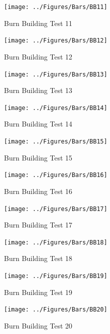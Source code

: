 \documentclass[12pt,oneside]{book}
\begin{document}
\clearpage

\begin{figure}[!ht]
	\texttt{[image: ../Figures/Bars/BB11]}
	\caption{Burn Building Test 11}
	\label{fig:Burn_Building_Test_11}
\end{figure}

\begin{figure}[!ht]
	\texttt{[image: ../Figures/Bars/BB12]}
	\caption{Burn Building Test 12}
	\label{fig:Burn_Building_Test_12}
\end{figure}

\begin{figure}[!ht]
	\texttt{[image: ../Figures/Bars/BB13]}
	\caption{Burn Building Test 13}
	\label{fig:Burn_Building_Test_13}
\end{figure}

\begin{figure}[!ht]
	\texttt{[image: ../Figures/Bars/BB14]}
	\caption{Burn Building Test 14}
	\label{fig:Burn_Building_Test_14}
\end{figure}

\clearpage

\begin{figure}[!ht]
	\texttt{[image: ../Figures/Bars/BB15]}
	\caption{Burn Building Test 15}
	\label{fig:Burn_Building_Test_15}
\end{figure}

\begin{figure}[!ht]
	\texttt{[image: ../Figures/Bars/BB16]}
	\caption{Burn Building Test 16}
	\label{fig:Burn_Building_Test_16}
\end{figure}

\begin{figure}[!ht]
	\texttt{[image: ../Figures/Bars/BB17]}
	\caption{Burn Building Test 17}
	\label{fig:Burn_Building_Test_17}
\end{figure}

\begin{figure}[!ht]
	\texttt{[image: ../Figures/Bars/BB18]}
	\caption{Burn Building Test 18}
	\label{fig:Burn_Building_Test_18}
\end{figure}

\clearpage

\begin{figure}[!ht]
	\texttt{[image: ../Figures/Bars/BB19]}
	\caption{Burn Building Test 19}
	\label{fig:Burn_Building_Test_19}
\end{figure}

\begin{figure}[!ht]
	\texttt{[image: ../Figures/Bars/BB20]}
	\caption{Burn Building Test 20}
	\label{fig:Burn_Building_Test_20}
\end{figure}
\end{document}
